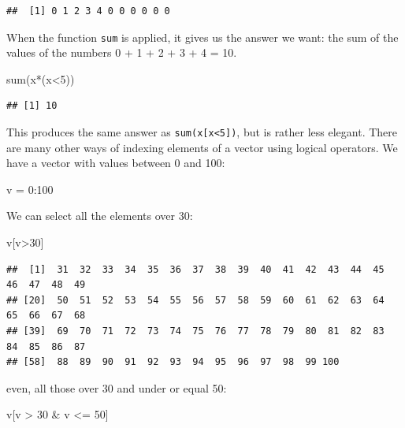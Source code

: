 \documentclass[
]{book}
\newenvironment{Shaded}{\begin{snugshade}}{\end{snugshade}}
\newcommand{\DecValTok}[1]{\textcolor[rgb]{0.00,0.00,0.81}{#1}}
\newcommand{\FunctionTok}[1]{\textcolor[rgb]{0.00,0.00,0.00}{#1}}
\newcommand{\NormalTok}[1]{#1}
\newcommand{\OtherTok}[1]{\textcolor[rgb]{0.56,0.35,0.01}{#1}}
\newcommand{\SpecialCharTok}[1]{\textcolor[rgb]{0.00,0.00,0.00}{#1}}
\theoremstyle{definition}
\theoremstyle{definition}
\theoremstyle{definition}
\theoremstyle{definition}
\theoremstyle{remark}
\begin{document}
\begin{verbatim}
##  [1] 0 1 2 3 4 0 0 0 0 0 0
\end{verbatim}

When the function \texttt{sum} is applied, it gives us the answer we want: the sum of the values of the numbers 0 + 1 + 2 + 3 + 4 = 10.

\begin{Shaded}
\begin{Highlighting}[]
\FunctionTok{sum}\NormalTok{(x}\SpecialCharTok{*}\NormalTok{(x}\SpecialCharTok{\textless{}}\DecValTok{5}\NormalTok{))}
\end{Highlighting}
\end{Shaded}

\begin{verbatim}
## [1] 10
\end{verbatim}

This produces the same answer as \texttt{sum(x{[}x\textless{}5{]})}, but is rather less elegant. There are many other ways of indexing elements of a vector using logical operators. We have a vector with values between 0 and 100:

\begin{Shaded}
\begin{Highlighting}[]
\NormalTok{v }\OtherTok{=} \DecValTok{0}\SpecialCharTok{:}\DecValTok{100}
\end{Highlighting}
\end{Shaded}

We can select all the elements over 30:

\begin{Shaded}
\begin{Highlighting}[]
\NormalTok{v[v}\SpecialCharTok{\textgreater{}}\DecValTok{30}\NormalTok{]}
\end{Highlighting}
\end{Shaded}

\begin{verbatim}
##  [1]  31  32  33  34  35  36  37  38  39  40  41  42  43  44  45  46  47  48  49
## [20]  50  51  52  53  54  55  56  57  58  59  60  61  62  63  64  65  66  67  68
## [39]  69  70  71  72  73  74  75  76  77  78  79  80  81  82  83  84  85  86  87
## [58]  88  89  90  91  92  93  94  95  96  97  98  99 100
\end{verbatim}

even, all those over 30 and under or equal 50:

\begin{Shaded}
\begin{Highlighting}[]
\NormalTok{v[v }\SpecialCharTok{\textgreater{}} \DecValTok{30} \SpecialCharTok{\&}\NormalTok{ v }\SpecialCharTok{\textless{}=} \DecValTok{50}\NormalTok{]}
\end{Highlighting}
\end{Shaded}
\end{document}
